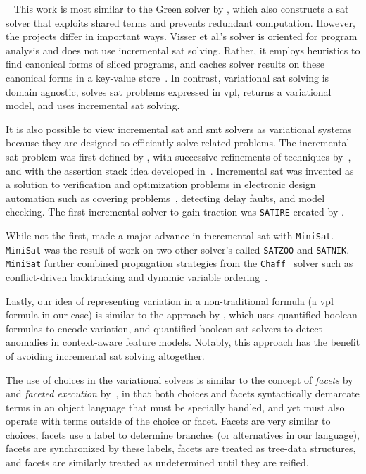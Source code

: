 ~\label{section:related-work:similar-solvers}
%
This work is most similar to the Green solver by \citet{VGD:FSE12}, which also
constructs a \ac{sat} solver that exploits shared terms and prevents redundant
computation. However, the projects differ in important ways. Visser et al.'s
solver is oriented for program analysis and does not use incremental \ac{sat}
solving. Rather, it employs heuristics to find canonical forms of sliced
programs, and caches solver results on these canonical forms in a key-value
store~\citep{redis}. In contrast, variational \ac{sat} solving is domain
agnostic, solves \ac{sat} problems expressed in \ac{vpl}, returns a variational
model, and uses incremental \ac{sat} solving.

It is also possible to view incremental \ac{sat} and \ac{smt} solvers as
variational systems because they are designed to efficiently solve related
problems. The incremental \ac{sat} problem was first defined by
\citet{hooker_1993}, with successive refinements of techniques
by~\citet{branch-bound}, and with the assertion stack idea developed
in~\citet{kim2000solving}. Incremental \ac{sat} was invented
as a solution to verification and optimization problems in electronic design
automation such as covering problems~\cite{10.1145/217474.217603}, detecting
delay faults\cite{10.1145/343647.343801}, and model
checking\cite{Clarke:1986:AVF:5397.5399}. The first incremental solver to gain
traction was \texttt{SATIRE} created by \citet{10.1145/378239.379019}.

While not the first, \citet{10.1007/978-3-540-24605-3_37} made a major advance
in incremental \ac{sat} with \texttt{MiniSat}. \texttt{MiniSat} was the result
of work on two other solver's called \texttt{SATZOO} and \texttt{SATNIK}.
\texttt{MiniSat} further combined propagation strategies from the
\texttt{Chaff}~\cite{Moskewicz:2001:CEE:378239.379017} solver such as
conflict-driven backtracking\cite{Zhang:2001:ECD:603095.603153} and dynamic
variable ordering~\cite{Moskewicz:2001:CEE:378239.379017}.

Lastly, our idea of representing variation in a non-traditional formula (a
\ac{vpl} formula in our case) is similar to the approach by
\cite{10.1145/3442391.3442405}, which uses quantified boolean formulas to encode
variation, and quantified boolean \ac{sat} solvers to detect anomalies in
context-aware feature models. Notably, this approach has the benefit of avoiding
incremental \ac{sat} solving altogether.

The use of choices in the variational solvers is similar to the concept of
\textit{facets} by~\cite{austin2012multiple} and \textit{faceted execution}
by~\cite{Schmitz2018FacetedSM,Micinski2018AbstractingFE,10.1145/2465106.2465121},
in that both choices and facets syntactically demarcate terms in an object
language that must be specially handled, and yet must also operate with terms
outside of the choice or facet. Facets are very similar to choices, facets use a
label to determine branches (or alternatives in our language), facets are
synchronized by these labels, facets are treated as tree-data structures, and
facets are similarly treated as undetermined until they are reified.

